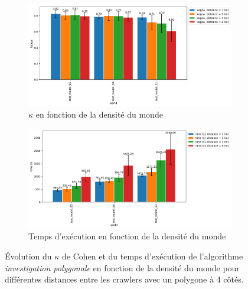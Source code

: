 \documentclass[english,RandD]{rapportPFE}  %
\begin{document}
			\begin{figure}[h!]
				\begin{subfigure}[t]{0.9\linewidth}
					\includegraphics[width=\linewidth]{graphics/investigation_polygonale-kappa_vs_world_for_each_d_k1_n2_p4.png}
					\caption{$\kappa$ en fonction de la densité du monde}
					\label{fig:investigation_polygonale-kappa_vs_world_for_each_d_k1_n2_p4}
				\end{subfigure}
				\hfill
				\begin{subfigure}[t]{0.9\linewidth}
						\includegraphics[width=\linewidth]{graphics/investigation_polygonale-time_vs_world_for_each_d_k1_n2_p4.png}
						\caption{Temps d'exécution en fonction de la densité du monde}
						\label{fig:investigation_polygonale-time_vs_world_for_each_d_k1_n2_p4}
				\end{subfigure}
				\caption{Évolution du $\kappa$ de Cohen et du temps d'exécution de l'algorithme \textit{investigation polygonale} en fonction de la densité du monde pour différentes distances entre les crawlers avec un polygone à 4 côtés.}
				\label{fig:investigation_polygonale-world_for_each_d_k1_n2_p4}
			\end{figure}
\end{document}
